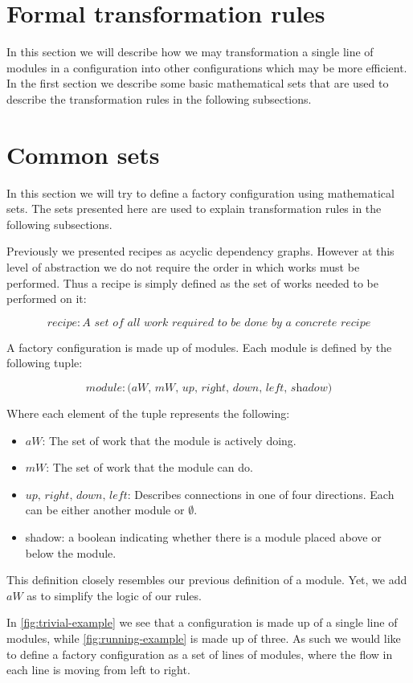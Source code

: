 \section{Formal transformation rules}
In this section we will describe how we may transformation a single line of modules in a configuration into other configurations which may be more efficient. In the first section we describe some basic mathematical sets that are used to describe the transformation rules in the following subsections.

\section{Common sets} 
In this section we will try to define a factory configuration using mathematical sets. The sets presented here are used to explain transformation rules in the following subsections.

Previously we presented recipes as acyclic dependency graphs. However at this level of abstraction we do not require the order in which works must be performed. Thus a recipe is simply defined as the set of works needed to be performed on it: 

\[recipe: \textit{A set of all work required to be done by a concrete recipe}\]

A factory configuration is made up of modules. Each module is defined by the following tuple:

\[module: \textit{(aW, mW, up, right, down, left, shadow)}\]

\noindent Where each element of the tuple represents the following:
\begin{itemize}
\item $aW$: The set of work that the module is actively doing.
\item $mW$: The set of work that the module can do.
\item $up,\, right,\, down,\, left$: Describes connections in one of four directions. Each can be either another module or $\emptyset$.
\item shadow: a boolean indicating whether there is a module placed above or below the module.
\end{itemize}

This definition closely resembles our previous definition of a module. Yet, we add $aW$ as to simplify the logic of our rules. 


In \cref{fig:trivial-example} we see that a configuration is made up of a single line of modules, while \cref{fig:running-example} is made up of three. As such we would like to define a factory configuration as a set of lines of modules, where the flow in each line is moving from left to right.

